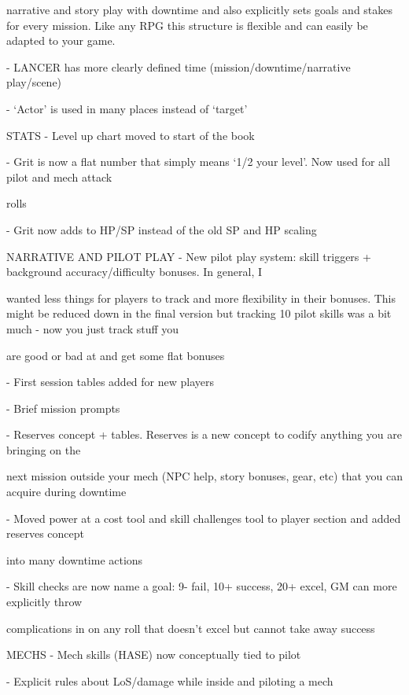          narrative and story play with downtime and also explicitly sets goals and stakes for every mission.
         Like any RPG this structure is flexible and can easily be adapted to your game.

     -   LANCER has more clearly defined time (mission/downtime/narrative play/scene)

     -   ‘Actor’ is used in many places instead of ‘target’

STATS
     -   Level up chart moved to start of the book

     -   Grit is now a flat number that simply means ‘1/2 your level’. Now used for all pilot and mech attack

         rolls





    -    Grit now adds to HP/SP instead of the old SP and HP scaling


NARRATIVE AND PILOT PLAY
    -    New pilot play system: skill triggers + background accuracy/difficulty bonuses. In general, I

         wanted less things for players to track and more flexibility in their bonuses. This might be reduced
         down in the final version but tracking 10 pilot skills was a bit much - now you just track stuff you

         are good or bad at and get some flat bonuses

    -    First session tables added for new players


    -    Brief mission prompts

    -    Reserves concept + tables. Reserves is a new concept to codify anything you are bringing on the

         next mission outside your mech (NPC help, story bonuses, gear, etc) that you can acquire during
         downtime

    -    Moved power at a cost tool and skill challenges tool to player section and added reserves concept

         into many downtime actions

    -    Skill checks are now name a goal: 9- fail, 10+ success, 20+ excel, GM can more explicitly throw

         complications in on any roll that doesn’t excel but cannot take away success


MECHS
    -    Mech skills (HASE) now conceptually tied to pilot


    -    Explicit rules about LoS/damage while inside and piloting a mech

